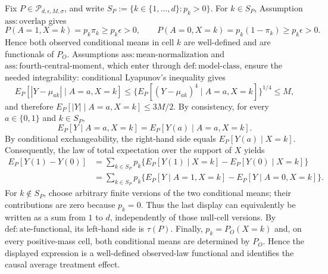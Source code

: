 Fix \(P\in\mathcal P_{d,\epsilon,M,\sigma}\), and write \(S_P:=\{k\in\{1,\ldots,d\}:p_k>0\}\). For \(k\in S_P\), Assumption \(\mathrm{ass:overlap}\) gives
\[
P(A=1,X=k)=p_k\pi_k\ge p_k\epsilon>0,\qquad P(A=0,X=k)=p_k(1-\pi_k)\ge p_k\epsilon>0.
\]
Hence both observed conditional means in cell \(k\) are well-defined and are functionals of \(P_O\). Assumptions \(\mathrm{ass:mean\text{-}normalization}\) and \(\mathrm{ass:fourth\text{-}central\text{-}moment}\), which enter through \(\mathrm{def:model\text{-}class}\), ensure the needed integrability: conditional Lyapunov's inequality gives
\[
E_P[|Y-\mu_{ak}|\mid A=a,X=k]\le\{E_P[(Y-\mu_{ak})^4\mid A=a,X=k]\}^{1/4}\le M,
\]
and therefore \(E_P[|Y|\mid A=a,X=k]\le 3M/2\). By consistency, for every \(a\in\{0,1\}\) and \(k\in S_P\),
\[
E_P[Y\mid A=a,X=k]=E_P[Y(a)\mid A=a,X=k].
\]
By conditional exchangeability, the right-hand side equals \(E_P[Y(a)\mid X=k]\). Consequently, the law of total expectation over the support of \(X\) yields
\[
\begin{aligned}
E_P[Y(1)-Y(0)]
&=\sum_{k\in S_P}p_k\{E_P[Y(1)\mid X=k]-E_P[Y(0)\mid X=k]\}\\
&=\sum_{k\in S_P}p_k\{E_P[Y\mid A=1,X=k]-E_P[Y\mid A=0,X=k]\}.
\end{aligned}
\]
For \(k\notin S_P\), choose arbitrary finite versions of the two conditional means; their contributions are zero because \(p_k=0\). Thus the last display can equivalently be written as a sum from \(1\) to \(d\), independently of those null-cell versions. By \(\mathrm{def:ate\text{-}functional}\), its left-hand side is \(\tau(P)\). Finally, \(p_k=P_O(X=k)\) and, on every positive-mass cell, both conditional means are determined by \(P_O\). Hence the displayed expression is a well-defined observed-law functional and identifies the causal average treatment effect.
